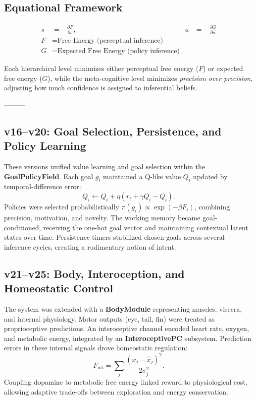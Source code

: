 \documentclass[9pt]{elife}
\begin{document}
\subsection{Equational Framework}

\begin{align}
\dot{s} &= -\frac{\partial F}{\partial s}, &
\dot{a} &= -\frac{\partial G}{\partial a} \\
F &= \text{Free Energy (perceptual inference)} \\
G &= \text{Expected Free Energy (policy inference)}
\end{align}

Each hierarchical level minimizes either perceptual free energy ($F$) or expected free energy ($G$), while the meta-cognitive level minimizes \textit{precision over precision}, adjusting how much confidence is assigned to inferential beliefs.


---------
\subsection{v16–v20: Goal Selection, Persistence, and Policy Learning}

These versions unified value learning and goal selection
within the \textbf{GoalPolicyField}.
Each goal $g_i$ maintained a Q-like value $Q_i$ updated by
temporal-difference error:
\[
Q_i \leftarrow Q_i + \eta (r_t + \gamma Q_i - Q_i).
\]
Policies were selected probabilistically
$\pi(g_i) \propto \exp(-\beta F_i)$,
combining precision, motivation, and novelty.
The working memory became goal-conditioned, receiving the one-hot goal vector
and maintaining contextual latent states over time.
Persistence timers stabilized chosen goals across several inference cycles,
creating a rudimentary notion of intent.

\subsection{v21–v25: Body, Interoception, and Homeostatic Control}

The system was extended with a \textbf{BodyModule}
representing muscles, viscera, and internal physiology.
Motor outputs (eye, tail, fin) were treated as proprioceptive predictions.
An interoceptive channel encoded heart rate, oxygen, and metabolic energy,
integrated by an \textbf{InteroceptivePC} subsystem.
Prediction errors in these internal signals
drove homeostatic regulation:
\[
F_{\mathrm{int}} = \sum_j \frac{(x_j - \hat{x}_j)^2}{2\sigma_j^2}.
\]
Coupling dopamine to metabolic free energy linked reward
to physiological cost, allowing adaptive trade-offs between
exploration and energy conservation.
\end{document}
